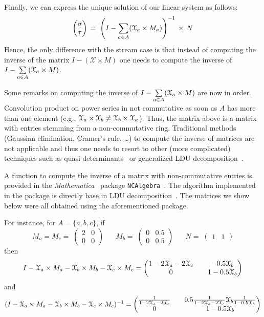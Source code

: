 \documentclass[3p]{elsarticle}
\newcommand{\X}{\mathcal{X}}           %
\newcommand{\streamproduct}{\times} %
\begin{document}
Finally, we can express the unique solution of our linear system as follows:
\[
\begin{pmatrix}%
\sigma \\ \tau
\end{pmatrix}
\, = \; \left(I - \sum_{a\in A} (\Xa \streamproduct
M_a)\right)^{-1} \, \streamproduct \, N
\]
Hence, the only difference with the stream case is that instead of
computing the inverse of the matrix $I - (\X\streamproduct M)$ one
needs to compute the inverse of $I - \sum\limits_{a\in A}
(\Xa\streamproduct M)$.

Some remarks on computing the inverse of $I - \sum\limits_{a\in A}
(\Xa\streamproduct M)$ are now in order. Convolution product on
power series in not commutative as soon as $A$ has more than one
element (e.g., $\Xa \streamproduct \Xb \neq \Xb \streamproduct \Xa$).
Thus, the matrix above is a matrix with
 entries stemming from a non-commutative ring. Traditional methods
(Gaussian elimination, Cramer's rule,
\ldots) to
compute the inverse of matrices are not applicable and thus one needs
to resort to other (more complicated) techniques such as
quasi-determinants~\cite{Retakh} or generalized LDU decomposition~\cite{ldu}.


A function to compute the inverse of
a matrix with non-commutative entries is provided in the
\emph{Mathematica}~\cite{mathematica} package
\texttt{NCAlgebra}~\cite{NCAlgebra}. The algorithm implemented in the package is directly base in LDU decomposition~\cite{ldu}. The matrices we show below were all obtained using the aforementioned package.

For instance, for $A=\{a,b,c\}$, if
\[
M_a = M_c = \;
\begin{pmatrix}
2 & 0 \\ 0  & 0
\end{pmatrix}
\;\;\;\;\;\;
M_b = \;
\begin{pmatrix}
0 & 0.5 \\ 0  & 0.5
\end{pmatrix}
\;\;\;\;\;\;
N = \;
\begin{pmatrix}
1  &  1
\end{pmatrix}
\]
then
\[
I-\Xa\streamproduct M_a - \Xb\streamproduct M_b -
\X_c\streamproduct M_c =
\begin{pmatrix}
1-2\Xa-2\X_c  &&  -0.5 \Xb \\
0 && 1-0.5\Xb
\end{pmatrix}
\]
and
\[
(I-\Xa\streamproduct M_a - \Xb\streamproduct M_b -
\X_c\streamproduct M_c)^{-1} =
\begin{pmatrix}
\frac{1}{1-2\Xa-2\X_c}  &&  0.5\frac{1}{1-2\Xa-2\X_c}\Xb\frac{1}{1 -0.5 \Xb} \\
0 && 1-0.5\Xb
\end{pmatrix}
\]
%
%
%
\end{document}
